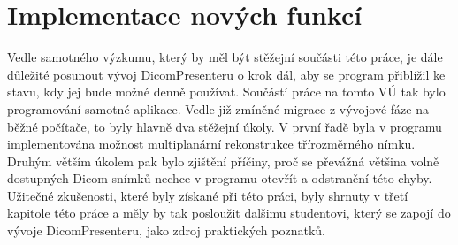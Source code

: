 \section{Implementace nových funkcí}
Vedle samotného výzkumu, který by měl být stěžejní součásti této práce, je dále důležité posunout vývoj DicomPresenteru o krok dál, aby se program přiblížil ke stavu, kdy jej bude možné denně používat. Součástí práce na tomto VÚ tak bylo programování samotné aplikace. Vedle již zmíněné migrace z vývojové fáze na běžné počítače, to byly hlavně dva stěžejní úkoly. V první řadě byla v programu implementována možnost multiplanární rekonstrukce třírozměrného nímku. Druhým větším úkolem pak bylo zjištění příčiny, proč se převážná většina volně dostupných Dicom snímků nechce v programu otevřít a odstranění této chyby. Užitečné zkušenosti, které byly získané při této práci, byly shrnuty v třetí kapitole této práce a měly by tak posloužit dalšimu studentovi, který se zapojí do vývoje DicomPresenteru, jako zdroj praktických poznatků.

